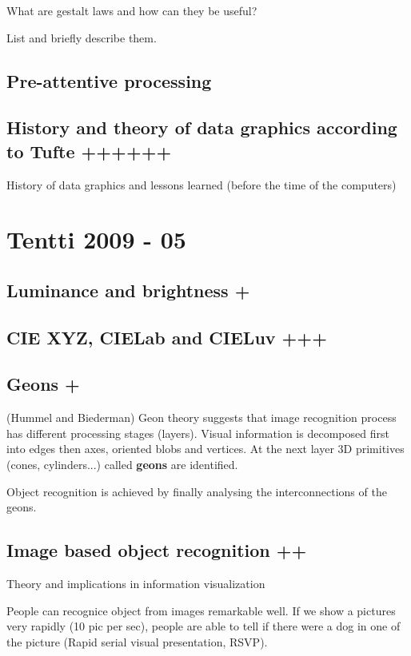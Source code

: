 \documentclass[a4paper]{article}
\begin{document}
What are gestalt laws and how can they be useful?

List and briefly describe them.

\subsection{Pre-attentive processing}

\subsection{History and theory of data graphics according to Tufte ++++++}

History of data graphics and lessons learned (before the time of the computers)

\section{Tentti 2009 - 05}

\subsection{Luminance and brightness +}

\subsection{CIE XYZ, CIELab and CIELuv +++}

\subsection{Geons +}

(Hummel and Biederman) Geon theory suggests that image recognition process has different processing stages (layers). Visual information is decomposed first into edges then axes, oriented blobs and vertices. At the next layer 3D primitives (cones, cylinders...) called \textbf{geons} are identified.

Object recognition is achieved by finally analysing the interconnections of the geons.

\subsection{Image based object recognition ++}

Theory and implications in information visualization

People can recognice object from images remarkable well. If we show a pictures very rapidly (10 pic per sec), people are able to tell if there were a dog in one of the picture (Rapid serial visual presentation, RSVP).
\end{document}

